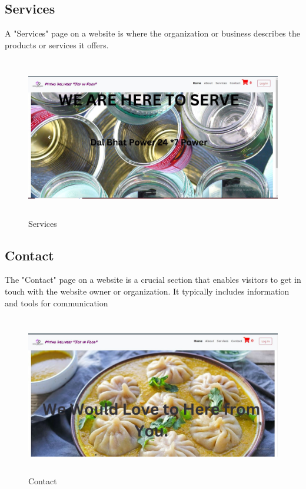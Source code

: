 \subsection{Services}
A "Services" page on a website is where the organization or business describes the products or services it offers.
\begin{figure}[h]
    \centering
    \includegraphics[height=7cm]{img/Graphics/service.JPG}
    \caption{Services}
\end{figure}

\subsection{Contact}
The "Contact" page on a website is a crucial section that enables visitors to get in touch with the website owner or organization. It typically includes information and tools for communication
\begin{figure}[h]
    \centering
    \includegraphics[height=7cm]{img/Graphics/contact.JPG}
    \caption{Contact}
\end{figure}

\newpage

